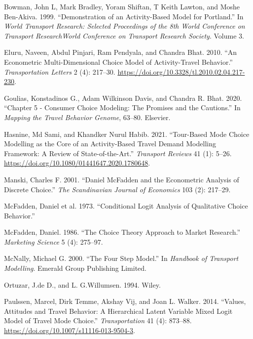 \documentclass[12pt, oneside, openright]{byuthesis}
\newlength{\cslhangindent}
\newlength{\cslentryspacingunit} %
\newenvironment{CSLReferences}[2] %
 {%
  \setlength{\parindent}{0pt}
  \ifodd #1
  \let\oldpar\par
  \def\par{\hangindent=\cslhangindent\oldpar}
  \fi
  \setlength{\parskip}{#2\cslentryspacingunit}
 }%
 {}
\begin{document}
\begin{CSLReferences}{1}{0}
\leavevmode{}%
Bowman, John L, Mark Bradley, Yoram Shiftan, T Keith Lawton, and Moshe Ben-Akiva. 1999. {``Demonstration of an Activity-Based Model for Portland.''} In \emph{World Transport Research: Selected Proceedings of the 8th World Conference on Transport ResearchWorld Conference on Transport Research Society}. Volume 3.

\leavevmode{}%
Eluru, Naveen, Abdul Pinjari, Ram Pendyala, and Chandra Bhat. 2010. {``An Econometric Multi-Dimensional Choice Model of Activity-Travel Behavior.''} \emph{Transportation Letters} 2 (4): 217--30. \url{https://doi.org/10.3328/tl.2010.02.04.217-230}.

\leavevmode{}%
Goulias, Konstadinos G., Adam Wilkinson Davis, and Chandra R. Bhat. 2020. {``Chapter 5 - Consumer Choice Modeling: The Promises and the Cautions.''} In \emph{Mapping the Travel Behavior Genome}, 63--80. Elsevier.

\leavevmode{}%
Hasnine, Md Sami, and Khandker Nurul Habib. 2021. {``Tour-Based Mode Choice Modelling as the Core of an Activity-Based Travel Demand Modelling Framework: A Review of State-of-the-Art.''} \emph{Transport Reviews} 41 (1): 5--26. \url{https://doi.org/10.1080/01441647.2020.1780648}.

\leavevmode{}%
Manski, Charles F. 2001. {``Daniel McFadden and the Econometric Analysis of Discrete Choice.''} \emph{The Scandinavian Journal of Economics} 103 (2): 217--29.

\leavevmode{}%
McFadden, Daniel et al. 1973. {``Conditional Logit Analysis of Qualitative Choice Behavior.''}

\leavevmode{}%
McFadden, Daniel. 1986. {``The Choice Theory Approach to Market Research.''} \emph{Marketing Science} 5 (4): 275--97.

\leavevmode{}%
McNally, Michael G. 2000. {``The Four Step Model.''} In \emph{Handbook of Transport Modelling}. Emerald Group Publishing Limited.

\leavevmode{}%
Ortuzar, J.de D., and L. G.Willumsen. 1994. Wiley.

\leavevmode{}%
Paulssen, Marcel, Dirk Temme, Akshay Vij, and Joan L. Walker. 2014. {``Values, Attitudes and Travel Behavior: A Hierarchical Latent Variable Mixed Logit Model of Travel Mode Choice.''} \emph{Transportation} 41 (4): 873--88. \url{https://doi.org/10.1007/s11116-013-9504-3}.


\end{CSLReferences}
\end{document}
